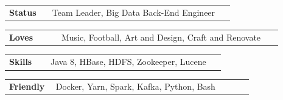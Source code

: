 \documentclass[10pt,A4]{article}
\newcommand{\tzlarrow}{(0,0) -- (0.2,0) -- (0.3,0.2) -- (0.2,0.4) -- (0,0.4) -- (0.1,0.2) -- cycle;}
\newcommand{\larrow}[1]
{\begin{tikzpicture}[scale=0.58]
	 \filldraw[fill=#1!100,draw=#1!100!black]  \tzlarrow
 \end{tikzpicture}
}
\newcommand{\metasection}[2]{
	\begin{tabular*}{1\linewidth}{p{0.18\linewidth} p{0.76\linewidth}}
		\larrow{bgcol}\normalsize{\textbf{\textcolor{sectcol}{#1}}}&#2\\
	\end{tabular*}
}
\newcommand{\spread}{7pt}
\begin{document}
\begin{minipage}[t]{0.485\textwidth}

\vspace{\spread}

\metasection{Status}{Team Leader, Big Data Back-End Engineer}
\metasection{Loves}{Music, Football, Art and Design, Craft and Renovate}
\end{minipage}
\hfill
\begin{minipage}[t]{0.485\textwidth}

\vspace{5pt}

\metasection{Skills}{Java 8, HBase, HDFS, Zookeeper, Lucene}
\metasection{Friendly}{Docker, Yarn, Spark, Kafka, Python, Bash}
\end{minipage}
\end{document}
